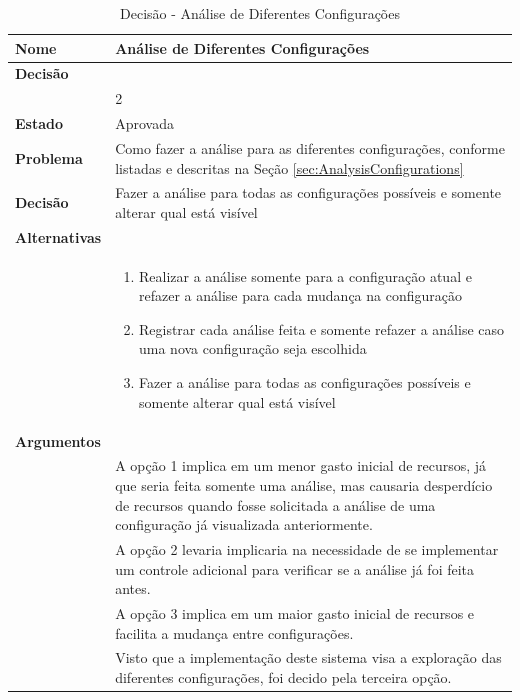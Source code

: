 \documentclass[12pt]{article}
\begin{document}
\begin{table}[H]
	\centering
	\caption{Decisão - Análise de Diferentes Configurações}
	\begin{tabular}{p{3cm} p{11cm}}
		\textbf{Nome}		&	Análise de Diferentes Configurações \\
		\toprule
		\textbf{Decisão}	&   \\
							& 2 \\
		\toprule
		\midrule
		\textbf{Estado}		& Aprovada \\
		\midrule
		\textbf{Problema}	& Como fazer a análise para as diferentes configurações, conforme listadas e descritas na Seção \ref{sec:AnalysisConfigurations}\\
		\midrule
		\textbf{Decisão}	& Fazer a análise para todas as configurações possíveis e somente alterar qual está visível\\
		\midrule
		\textbf{Alternativas} & \\
		& \begin{enumerate}
			\item Realizar a análise somente para a configuração atual e refazer a análise para cada mudança na configuração
			\item Registrar cada análise feita e somente refazer a análise caso uma nova configuração seja escolhida
			\item Fazer a análise para todas as configurações possíveis e somente alterar qual está visível
		\end{enumerate} \\
		\midrule
		\textbf{Argumentos} & \\
		& A opção 1 implica em um menor gasto inicial de recursos, já que seria feita somente uma análise, mas causaria desperdício de recursos quando fosse solicitada a análise de uma configuração já visualizada anteriormente. \\
		& A opção 2 levaria implicaria na necessidade de se implementar um controle adicional para verificar se a análise já foi feita antes. \\
		& A opção 3 implica em um maior gasto inicial de recursos e facilita a mudança entre configurações. \\
		& Visto que a implementação deste sistema visa a exploração das diferentes configurações, foi decido pela terceira opção. \\
		\bottomrule
	\end{tabular}		
\end{table}

\endgroup
\end{document}
